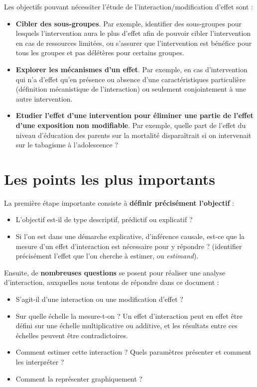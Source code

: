 \documentclass[
]{book}
\providecommand{\tightlist}{%
  \setlength{\itemsep}{0pt}\setlength{\parskip}{0pt}}
\begin{document}
Les objectifs pouvant nécessiter l'étude de l'interaction/modification d'effet sont \citet{vanderweele_tutorial_2014} :

\begin{itemize}
\tightlist
\item
  \textbf{Cibler des sous-groupes}. Par exemple, identifier des sous-groupes pour lesquels l'intervention aura le plus d'effet afin de pouvoir cibler l'intervention en cas de ressources limitées, ou s'assurer que l'intervention est bénéfice pour tous les groupes et pas délétères pour certains groupes.
\item
  \textbf{Explorer les mécanismes d'un effet}. Par exemple, en cas d'intervention qui n'a d'effet qu'en présence ou absence d'une caractéristiques particulière (définition mécanistique de l'interaction) ou seulement conjointement à une autre intervention.
\item
  \textbf{Etudier l'effet d'une intervention pour éliminer une partie de l'effet d'une exposition non modifiable}. Par exemple, quelle part de l'effet du niveau d'éducation des parents sur la mortalité disparaîtrait si on intervenait sur le tabagisme à l'adolescence ?
\end{itemize}

\hypertarget{les-points-les-plus-importants}{%
\section{Les points les plus importants}\label{les-points-les-plus-importants}}

La première étape importante consiste à \textbf{définir précisément l'objectif} :

\begin{itemize}
\tightlist
\item
  L'objectif est-il de type descriptif, prédictif ou explicatif ?
\item
  Si l'on est dans une démarche explicative, d'inférence causale, est-ce que la mesure d'un effet d'interaction est nécessaire pour y répondre ? (identifier précisément l'effet que l'on cherche à estimer, ou \emph{estimand}).
\end{itemize}

Ensuite, de \textbf{nombreuses questions} se posent pour réaliser une analyse d'interaction, auxquelles nous tentons de répondre dans ce document :

\begin{itemize}
\tightlist
\item
  S'agit-il d'une interaction ou une modification d'effet ?
\item
  Sur quelle échelle la mesure-t-on ? Un effet d'interaction peut en effet être défini sur une échelle multiplicative ou additive, et les résultats entre ces échelles peuvent être contradictoires.
\item
  Comment estimer cette interaction ? Quels paramètres présenter et comment les interpréter ?
\item
  Comment la représenter graphiquement ?
\end{itemize}
\end{document}
